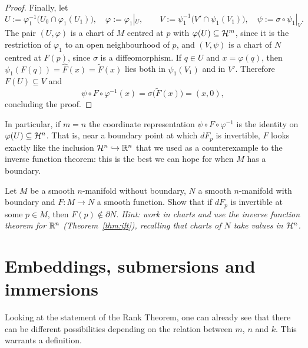 \begin{proof}
	Finally, let
	\begin{equation}
		U := \varphi_1^{-1}\big(U_0\cap\varphi_1(U_1)\big),\quad \varphi := \varphi_1|_U,
		\qquad
		V := \psi_1^{-1}\big(V'\cap\psi_1(V_1)\big),\quad \psi := \sigma\circ\psi_1|_V.
	\end{equation}
	The pair $(U,\varphi)$ is a chart of $M$ centred at $p$ with $\varphi(U)\subseteq\mathcal{H}^m$, since it is the restriction of $\varphi_1$ to an open neighbourhood of $p$, and $(V,\psi)$ is a chart of $N$ centred at $F(p)$, since $\sigma$ is a diffeomorphism.
	If $q\in U$ and $x = \varphi(q)$, then $\psi_1(F(q)) = \widehat F(x) = \widetilde F(x)$ lies both in $\psi_1(V_1)$ and in $V'$.
	Therefore $F(U)\subseteq V$ and
	\begin{equation}
		\psi\circ F\circ\varphi^{-1}(x) = \sigma\big(\widetilde F(x)\big) = (x, 0),
	\end{equation}
	concluding the proof.
\end{proof}

In particular, if $m = n$ the coordinate representation $\psi\circ F\circ\varphi^{-1}$ is the identity on $\varphi(U)\subseteq\mathcal{H}^n$.
That is, near a boundary point at which $dF_p$ is invertible, $F$ looks exactly like the inclusion $\mathcal{H}^n\hookrightarrow\mathbb{R}^n$ that we used as a counterexample to the inverse function theorem: this is the best we can hope for when $M$ has a boundary.

\begin{exercise}
	Let $M$ be a smooth $n$-manifold without boundary, $N$ a smooth $n$-manifold with boundary and $F:M\to N$ a smooth function.
	Show that if $dF_p$ is invertible at some $p\in M$, then $F(p)\notin\partial N$.
	\textit{\small Hint: work in charts and use the inverse function theorem for $\mathbb{R}^n$ (Theorem~\ref{thm:ift}), recalling that charts of $N$ take values in $\mathcal{H}^n$.}
\end{exercise}

\section{Embeddings, submersions and immersions}

Looking at the statement of the Rank Theorem, one can already see that there can be different possibilities depending on the relation between $m$, $n$ and $k$. This warrants a definition.

